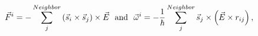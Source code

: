 \documentclass[preview]{standalone}
\begin{document}
\begin{varwidth}{50in}
  \begin{equation}
    \vec{F}^{i} = -\sum_{j}^{Neighbor} \left( \vec{s}_{i}\times \vec{s}_{j} \right)
    \times \vec{E} ~~{\rm and}~~ \vec{\omega}^{i} = -\frac{1}{\hbar} 
    \sum_{j}^{Neighbor} \vec{s}_j \times \left(\vec{E}\times r_{ij} \right),\nonumber
  \end{equation}
\end{varwidth}
\end{document}
